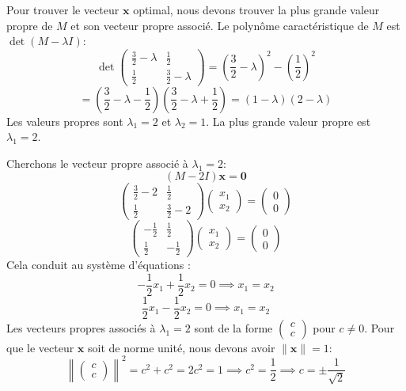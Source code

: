 \documentclass[11pt,a4paper]{report}
\begin{document}
Pour trouver le vecteur \(\mathbf{x}\) optimal, nous devons trouver la
plus grande valeur propre de \(M\) et son vecteur propre associé. Le
polynôme caractéristique de \(M\) est \(\det(M - \lambda I)\):
\[ \det \begin{pmatrix} \frac{3}{2} - \lambda & \frac{1}{2} \\ \frac{1}{2} & \frac{3}{2} - \lambda \end{pmatrix} = \left( \frac{3}{2} - \lambda \right)^2 - \left( \frac{1}{2} \right)^2 \]
\[ = \left( \frac{3}{2} - \lambda - \frac{1}{2} \right) \left( \frac{3}{2} - \lambda + \frac{1}{2} \right) = (1 - \lambda)(2 - \lambda) \]
Les valeurs propres sont \(\lambda_1 = 2\) et \(\lambda_2 = 1\). La plus
grande valeur propre est \(\lambda_1 = 2\).

Cherchons le vecteur propre associé à \(\lambda_1 = 2\):
\[ (M - 2I) \mathbf{x} = \mathbf{0} \]
\[ \begin{pmatrix} \frac{3}{2} - 2 & \frac{1}{2} \\ \frac{1}{2} & \frac{3}{2} - 2 \end{pmatrix} \begin{pmatrix} x_1 \\ x_2 \end{pmatrix} = \begin{pmatrix} 0 \\ 0 \end{pmatrix} \]
\[ \begin{pmatrix} -\frac{1}{2} & \frac{1}{2} \\ \frac{1}{2} & -\frac{1}{2} \end{pmatrix} \begin{pmatrix} x_1 \\ x_2 \end{pmatrix} = \begin{pmatrix} 0 \\ 0 \end{pmatrix} \]
Cela conduit au système d'équations :
\[ -\frac{1}{2} x_1 + \frac{1}{2} x_2 = 0 \implies x_1 = x_2 \]
\[ \frac{1}{2} x_1 - \frac{1}{2} x_2 = 0 \implies x_1 = x_2 \] Les
vecteurs propres associés à \(\lambda_1 = 2\) sont de la forme
\(\begin{pmatrix} c \\ c \end{pmatrix}\) pour \(c \ne 0\). Pour que le
vecteur \(\mathbf{x}\) soit de norme unité, nous devons avoir
\(\|\mathbf{x}\|=1\):
\[ \left\| \begin{pmatrix} c \\ c \end{pmatrix} \right\|^2 = c^2 + c^2 = 2c^2 = 1 \implies c^2 = \frac{1}{2} \implies c = \pm \frac{1}{\sqrt{2}} \]
\end{document}
